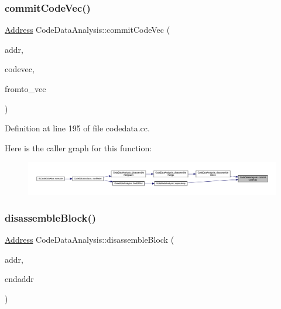 \subsubsection{\texorpdfstring{commitCodeVec()}{commitCodeVec()}}
{\footnotesize\ttfamily \mbox{\hyperlink{class_address}{Address}} Code\+Data\+Analysis\+::commit\+Code\+Vec (\begin{DoxyParamCaption}\item[{const \mbox{\hyperlink{class_address}{Address}} \&}]{addr,  }\item[{vector$<$ \mbox{\hyperlink{class_code_unit}{Code\+Unit}} $>$ \&}]{codevec,  }\item[{map$<$ \mbox{\hyperlink{struct_addr_link}{Addr\+Link}}, uint4 $>$ \&}]{fromto\+\_\+vec }\end{DoxyParamCaption})}



Definition at line 195 of file codedata.\+cc.

Here is the caller graph for this function\+:
\nopagebreak
\begin{figure}[H]
\begin{center}
\leavevmode
\includegraphics[width=350pt]{class_code_data_analysis_aa6c8fe296a63965974a3cc279e1a7c65_icgraph}
\end{center}
\end{figure}
\mbox{\label{class_code_data_analysis_adee07d792d5bf97891fb5d79c3c44d3a}} 
\subsubsection{\texorpdfstring{disassembleBlock()}{disassembleBlock()}}
{\footnotesize\ttfamily \mbox{\hyperlink{class_address}{Address}} Code\+Data\+Analysis\+::disassemble\+Block (\begin{DoxyParamCaption}\item[{const \mbox{\hyperlink{class_address}{Address}} \&}]{addr,  }\item[{const \mbox{\hyperlink{class_address}{Address}} \&}]{endaddr }\end{DoxyParamCaption})}



